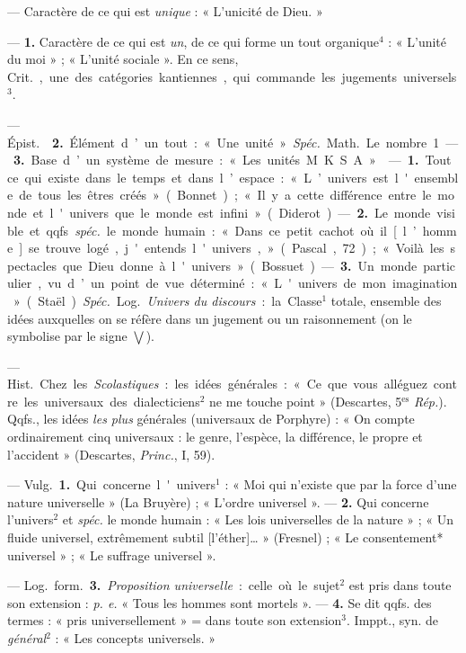 \begin{itemize}[leftmargin=1cm, label=, itemsep=1pt]
 — Caractère de ce qui est {\it unique} : « L’unicité de Dieu. »

 —  {\bf 1.} Caractère de ce qui est {\it un}, de ce
qui forme un tout organique$^4$ : « L'unité du moi » ; « L'unité sociale ».
En ce sens, \si{Crit.}, une des catégories kantiennes, qui commande les
jugements universels$^3$.

— \si{Épist.}  {\bf 2.} Élément d’un tout : « Une unité »
{\it Spéc.} \si{Math.} Le nombre 1. — {\bf 3.} Base d’un système de mesure :
« Les unités M. K. S. A. »

 — {\bf 1.} Tout ce qui existe dans le temps et dans l’espace : «
L’univers est l'ensemble de tous les êtres créés » (Bonnet) ; « Il y a cette
différence entre le monde et l'univers que le monde est infini » (Diderot). —
{\bf 2.} Le monde visible et qqfs. {\it spéc.} le monde humain : « Dans ce
petit cachot où il [l’homme] se trouve logé, j'entends l'univers,...
» (Pascal, 72) ; « Voilà les spectacles que Dieu donne à l'univers
» (Bossuet). — {\bf 3.} Un monde particulier, vu d’un point de vue
déterminé : « L'univers de mon imagination » (Staël). {\it Spéc.} \si{Log.}
{\it Univers du discours} : la Classe$^1$ totale, ensemble des idées
auxquelles on se réfère
dans un jugement ou un raisonnement (on le symbolise par le signe $\bigvee$).

 — \si{Hist.} Chez les {\it Scolastiques} : les idées
générales : « Ce que vous alléguez contre les universaux des dialecticiens$^2$
ne me touche point » (Descartes, 5$^\text{es}$ {\it Rép.}). Qqfs., les idées
{\it les plus} générales (universaux de Porphyre) : « On compte ordinairement
cinq universaux : le genre, l'espèce, la différence, le propre et l'accident
» (Descartes, {\it Princ.}, I, 59).

 — \si{Vulg.} {\bf 1.} Qui concerne l'univers$^1$ : « Moi qui
n'existe que par la force d’une nature universelle » (La Bruyère) ; « L'ordre
universel ». — {\bf 2.} Qui concerne l’univers$^2$ et {\it spéc.} le monde
humain : « Les lois universelles de la nature » ; « Un fluide universel,
extrêmement subtil [l'éther]… » (Fresnel) ; « Le consentement* universel » ;
« Le suffrage universel ».

— \si{Log.} \si{form.} {\bf 3.} {\it Proposition universelle} : celle où le
sujet$^2$ est pris dans toute son extension : {\it p. e.} « Tous les hommes
sont mortels ». — {\bf 4.} Se dit qqfs. des termes : « pris universellement »
= dans toute son extension$^3$. Imppt., syn. de {\it général}$^2$ : « Les
concepts universels. »


\end{itemize}
